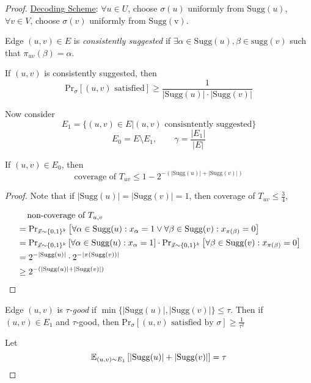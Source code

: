 \begin{proof}
    \underline{Decoding Scheme}:  $ \forall u\in U $, choose  $ \sigma(u) $ uniformly from  $ \mathrm{Sugg}(u) $,  $ \forall v\in V $, choose  $ \sigma(v) $ uniformly from  $ \mathrm{Sugg(v)} $.

    \begin{definition}
        Edge  $ (u,v)\in E $ is \textit{consistently suggested} if  $ \exists \alpha\in \mathrm{Sugg}(u),\beta\in \mathrm{sugg}(v) $ such that  $ \pi_{uv}(\beta)=\alpha $.
        
        \begin{fact}
            If  $ (u,v)  $ is consistently suggested, then 
            \[\mathrm{Pr}_\sigma[(u,v)\text{ satisfied}] \geq \frac{1}{|\mathrm{Sugg}(u)|\cdot|\mathrm{Sugg}(v)|}\]
        \end{fact}
    \end{definition}
    Now consider 
    \[E_1=\{(u,v)\in E|(u,v)\text{ consisntently suggested}\}\]
    \[E_0=E\setminus E_1,\qquad \gamma=\frac{|E_1|}{|E|}\]
    \begin{lemma}
        If  $ (u,v)\in E_0 $, then 
        \[\text{coverage of }T_{uv} \leq 1-2^{-\left(|\mathrm{Sugg}(u)|+|\mathrm{Sugg}(v)|\right)}\]
    \end{lemma}
    \begin{proof}
        Note that if  $ |\mathrm{Sugg}(u)|=|\mathrm{Sugg}(v)|=1 $, then coverage of  $ T_{uv} \leq \frac{3}{4} $,
        
        \begin{align*}
            &\quad\,\text{non-coverage of  $ T_{u,v} $ }\\
            &=\mathrm{Pr}_{\vec{x}\sim\{0,1\}^k}\left[\forall \alpha\in \mathrm{Sugg}(u):x_\alpha=1\vee \forall \beta\in \mathrm{Sugg}(v):x_{\pi(\beta)}=0\right]\\
            &=\mathrm{Pr}_{\vec{x}\sim\{0,1\}^k}\left[\forall \alpha\in \mathrm{Sugg}(u):x_\alpha=1\right]\cdot\mathrm{Pr}_{\vec{x}\sim\{0,1\}^k}\left[\forall \beta\in \mathrm{Sugg}(v):x_{\pi(\beta)}=0\right]\\
            &=2^{-|\mathrm{Sugg}(u)|}\cdot2^{-|\pi(\mathrm{Sugg}(v))|}\\
            &   \geq 2^{-\left(|\mathrm{Sugg}(u)|+|\mathrm{Sugg}(v)|\right)}
        \end{align*}
    \end{proof}

    \begin{definition}
        Edge  $ (u,v) $ is  \textit{$ \tau $-good} if  $ \min\{|\mathrm{Sugg}(u)|,|\mathrm{Sugg}(v)|\} \leq \tau $. Then if  $ (u,v)\in E_1 $ and  $ \tau $-good, then  $ \mathrm{Pr}_\sigma[(u,v)\text{ satisfied by }\sigma] \geq \frac{1}{\tau^2} $     
    \end{definition}
    Let 
    \[\mathbb E_{(u,v)\sim E_1}\left[|\mathrm{Sugg}(u)|+|\mathrm{Sugg}(v)|\right]=\tau\]


\end{proof}
